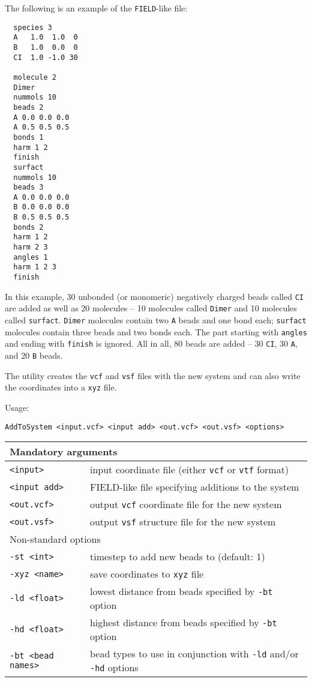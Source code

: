 The following is an example of the \texttt{FIELD}-like file:
\begin{verbatim}
  species 3
  A   1.0  1.0  0
  B   1.0  0.0  0
  CI  1.0 -1.0 30

  molecule 2
  Dimer
  nummols 10
  beads 2
  A 0.0 0.0 0.0
  A 0.5 0.5 0.5
  bonds 1
  harm 1 2
  finish
  surfact
  nummols 10
  beads 3
  A 0.0 0.0 0.0
  B 0.0 0.0 0.0
  B 0.5 0.5 0.5
  bonds 2
  harm 1 2
  harm 2 3
  angles 1
  harm 1 2 3
  finish
\end{verbatim}
In this example, 30 unbonded (or monomeric) negatively charged beads called \texttt{CI}
are added as well as 20 molecules -- 10 molecules called \texttt{Dimer} and
10 molecules called \texttt{surfact}. \texttt{Dimer} molecules contain two
\texttt{A} beads and one bond each; \texttt{surfact} molecules contain
three beads and two bonds each. The part starting with \texttt{angles} and
ending with \texttt{finish} is ignored. All in all, 80 beads are added --
30 \texttt{CI}, 30 \texttt{A}, and 20 \texttt{B} beads.

The utility creates the \texttt{vcf} and \texttt{vsf} files with the new
system and can also write the coordinates into a \texttt{xyz} file.

Usage:

\vspace{1em}
\noindent
\texttt{AddToSystem <input.vcf> <input add> <out.vcf> <out.vsf> <options>}

\vspace{1em}
\noindent
\begin{longtable}{p{}p{}}
  \toprule
  \multicolumn{2}{l}{Mandatory arguments} \\
  \midrule
  \texttt{<input>} & input coordinate file (either \texttt{vcf} or
    \texttt{vtf} format) \\
  \texttt{<input add>} & FIELD-like file specifying additions to the system \\
  \texttt{<out.vcf>} & output \texttt{vcf} coordinate file for the new
  system \\
  \texttt{<out.vsf>} & output \texttt{vsf} structure file for the new system \\
  \toprule
  \multicolumn{2}{l}{Non-standard options} \\
  \midrule
  \texttt{-st <int>} & timestep to add new beads to (default: 1) \\
  \texttt{-xyz <name>} & save coordinates to \texttt{xyz} file \\
  \texttt{-ld <float>} & lowest distance from beads specified by
    \texttt{-bt} option \\
  \texttt{-hd <float>} & highest distance from beads specified by
    \texttt{-bt} option \\
  \texttt{-bt <bead names>} & bead types to use in conjunction with
    \texttt{-ld} and/or \texttt{-hd} options \\
  \bottomrule
\end{longtable}
